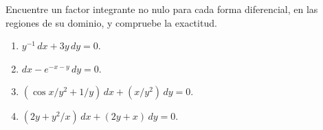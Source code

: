 Encuentre un factor integrante no nulo para cada forma diferencial, en las regiones de su dominio, y compruebe la exactitud.

\begin{enumerate}[label=(\alph*),ref=\alph*,leftmargin=*]
\item $y^{-1}\,dx+3y\,dy=0$.
\item $dx-e^{-x-y}\,dy=0$.
\item $\left(\cos x/y^2+1/y\right)\,dx+(x/y^2)\,dy=0$.
\item $\left(2y+y^2/x\right)\,dx+(2y+x)\,dy=0$.
\end{enumerate}
